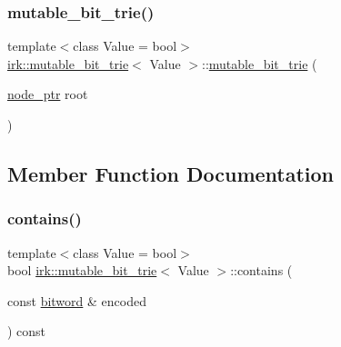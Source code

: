 \subsubsection{\texorpdfstring{mutable\+\_\+bit\+\_\+trie()}{mutable\_bit\_trie()}\hspace{0.1cm}{\footnotesize\ttfamily [2/2]}}
{\footnotesize\ttfamily template$<$class Value = bool$>$ \\
\mbox{\hyperlink{classirk_1_1mutable__bit__trie}{irk\+::mutable\+\_\+bit\+\_\+trie}}$<$ Value $>$\+::\mbox{\hyperlink{classirk_1_1mutable__bit__trie}{mutable\+\_\+bit\+\_\+trie}} (\begin{DoxyParamCaption}\item[{\mbox{\hyperlink{classirk_1_1mutable__bit__trie_abd23179ac4f02a981d4f47b4c0652287}{node\+\_\+ptr}}}]{root }\end{DoxyParamCaption})\hspace{0.3cm}{\ttfamily [inline]}}



\subsection{Member Function Documentation}
\mbox{\label{classirk_1_1mutable__bit__trie_ab45e17c9d8b88f14654d52e27c092c30}} 
\subsubsection{\texorpdfstring{contains()}{contains()}}
{\footnotesize\ttfamily template$<$class Value = bool$>$ \\
bool \mbox{\hyperlink{classirk_1_1mutable__bit__trie}{irk\+::mutable\+\_\+bit\+\_\+trie}}$<$ Value $>$\+::contains (\begin{DoxyParamCaption}\item[{const \mbox{\hyperlink{namespaceirk_a979e09720c2ef05573819388a3c0e79a}{bitword}} \&}]{encoded }\end{DoxyParamCaption}) const\hspace{0.3cm}{\ttfamily [inline]}}

\mbox{\label{classirk_1_1mutable__bit__trie_abbfbe73cb98af4bb0375f00229cec50a}} 
